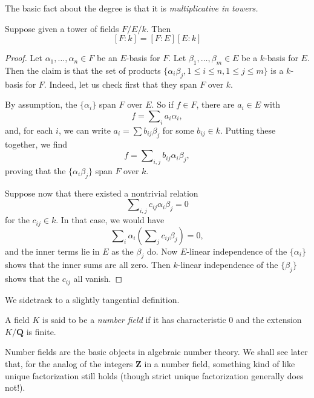 \medskip\noindent
The basic fact about the degree is that it is {\it multiplicative in towers.}

\begin{lemma}[Multiplicativity]
\label{lemma-multiplicativity-degrees}
Suppose given a tower of fields $F/E/k$. Then
$$
[F:k] = [F:E][E:k]
$$
\end{lemma}

\begin{proof}
Let $\alpha_1, \ldots, \alpha_n \in F$ be an $E$-basis for $F$. Let
$\beta_1, \ldots, \beta_m \in E$ be a $k$-basis for $E$. Then the claim is
that the set of products
$\{\alpha_i \beta_j, 1 \leq i \leq n, 1 \leq j \leq m\}$
is a $k$-basis for $F$. Indeed, let us check first that they span $F$ over $k$.

\medskip\noindent
By assumption, the $\{\alpha_i\}$ span $F$ over $E$. So if
$f \in F$, there are $a_i \in E$ with
$$
f = \sum\nolimits_i a_i \alpha_i,
$$
and, for each $i$, we can write $a_i = \sum b_{ij} \beta_j$ for some
$b_{ij} \in k$. Putting these together, we find
$$
f = \sum\nolimits_{i,j} b_{ij} \alpha_i \beta_j,
$$
proving that the $\{\alpha_i \beta_j\}$ span $F$ over $k$.

\medskip\noindent
Suppose now that there existed a nontrivial relation
$$
\sum\nolimits_{i,j} c_{ij} \alpha_i \beta_j = 0
$$
for the $c_{ij} \in k$. In that case, we would have
$$
\sum\nolimits_i \alpha_i \left( \sum\nolimits_j c_{ij} \beta_j \right) = 0,
$$
and the inner terms lie in $E$ as the $\beta_j$ do. Now $E$-linear
independence of the $\{\alpha_i\}$ shows that the inner sums are all zero.
Then $k$-linear independence of the $\{\beta_j\}$ shows that the
$c_{ij}$ all vanish.
\end{proof}

\noindent
We sidetrack to a slightly tangential definition.

\begin{definition}
\label{definition-number-field}
A field $K$ is said to be a {\it number field} if it has characteristic
$0$ and the extension $K/\mathbf{Q}$ is finite.
\end{definition}

\noindent
Number fields are the basic objects in algebraic number theory. We shall see
later that,
for the analog of the integers $\mathbf{Z}$ in a number field, something kind
of like unique factorization still holds (though strict unique factorization
generally does not!).


